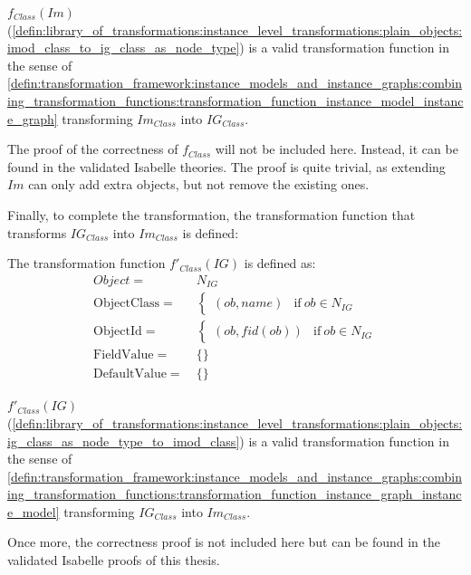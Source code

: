 \begin{thm}
\label{defin:library_of_transformations:instance_level_transformations:plain_objects:imod_class_to_ig_class_as_node_type_func}
$f_{Class}(Im)$ (\cref{defin:library_of_transformations:instance_level_transformations:plain_objects:imod_class_to_ig_class_as_node_type}) is a valid transformation function in the sense of \cref{defin:transformation_framework:instance_models_and_instance_graphs:combining_transformation_functions:transformation_function_instance_model_instance_graph} transforming $Im_{Class}$ into $IG_{Class}$.
\end{thm}

The proof of the correctness of $f_{Class}$ will not be included here. Instead, it can be found in the validated Isabelle theories. The proof is quite trivial, as extending $Im$ can only add extra objects, but not remove the existing ones.

Finally, to complete the transformation, the transformation function that transforms $IG_{Class}$ into $Im_{Class}$ is defined:

\begin{defin}
\label{defin:library_of_transformations:instance_level_transformations:plain_objects:ig_class_as_node_type_to_imod_class}
The transformation function $f'_{Class}(IG)$ is defined as:
\begin{align*}
Object =\ &N_{IG} \\
\mathrm{ObjectClass} =\ & \begin{cases}
    (ob, name) & \mathrm{if }\ ob \in N_{IG}
\end{cases}\\
\mathrm{ObjectId} =\ & \begin{cases}
    (ob, fid(ob)) & \mathrm{if }\ ob \in N_{IG}
\end{cases}\\
\mathrm{FieldValue} =\ & \{\} \\
\mathrm{DefaultValue} =\ & \{\}
\end{align*}
\end{defin}

\begin{thm}
\label{defin:library_of_transformations:instance_level_transformations:plain_objects:ig_class_as_node_type_to_tmod_class_func}
$f'_{Class}(IG)$ (\cref{defin:library_of_transformations:instance_level_transformations:plain_objects:ig_class_as_node_type_to_imod_class}) is a valid transformation function in the sense of \cref{defin:transformation_framework:instance_models_and_instance_graphs:combining_transformation_functions:transformation_function_instance_graph_instance_model} transforming $IG_{Class}$ into $Im_{Class}$.
\end{thm}

Once more, the correctness proof is not included here but can be found in the validated Isabelle proofs of this thesis.